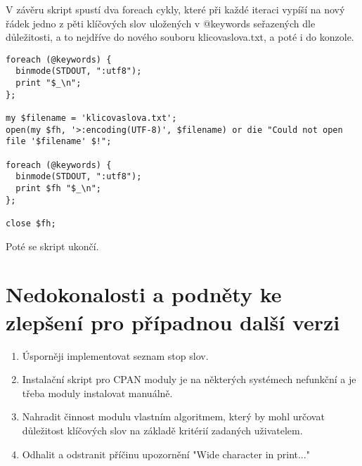 \documentclass[a4paper,11pt]{article}
\theoremstyle{mytheor}
\begin{document}
V závěru skript spustí dva foreach cykly, které při každé iteraci
vypíší na nový řádek jedno z pěti klíčových slov uložených v
@keywords seřazených dle důležitosti, a to nejdříve do nového
souboru klicovaslova.txt, a poté i do konzole.

\begin{lstlisting}[label={list:first},caption=Výstup skriptu -- Analyzátor klíčových slov.]
foreach (@keywords) {
  binmode(STDOUT, ":utf8");
  print "$_\n";
};

my $filename = 'klicovaslova.txt';
open(my $fh, '>:encoding(UTF-8)', $filename) or die "Could not open file '$filename' $!";

foreach (@keywords) {
  binmode(STDOUT, ":utf8");
  print $fh "$_\n";
};

close $fh;
\end{lstlisting}

Poté se skript ukončí.
\section*{Nedokonalosti a podněty ke zlepšení pro případnou další verzi}
\begin{enumerate}
\item Úsporněji implementovat seznam stop slov.
\item Instalační skript pro CPAN moduly je na některých systémech
nefunkční a je třeba moduly instalovat manuálně.
\item Nahradit činnost modulu vlastním algoritmem, který by mohl
určovat důležitost klíčových slov na základě kritérií zadaných
uživatelem.
\item Odhalit a odstranit příčinu upozornění "Wide character in print..."

\end{enumerate}
\end{document}
